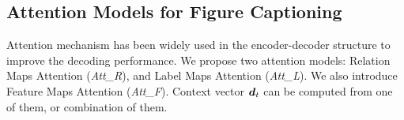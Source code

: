 \documentclass[11pt,a4paper]{article}
\begin{document}






\subsection{Attention Models for Figure Captioning}
Attention mechanism has been widely used in the encoder-decoder structure to improve the decoding performance. We propose two attention models: Relation Maps Attention (\textit{Att\_R}), and Label Maps Attention (\textit{Att\_L}). We also introduce Feature Maps Attention (\textit{Att\_F}). Context vector ${\boldsymbol d}_t$ can be computed from one of them, or combination of them. 
\end{document}
